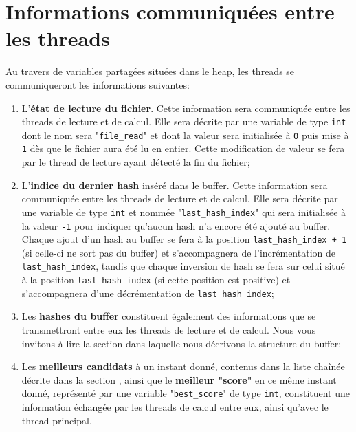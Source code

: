 \documentclass{article}
\begin{document}
\section{Informations communiquées entre les threads}
\noindent
	Au travers de variables partagées situées dans le heap, les threads se communiqueront les informations suivantes:
	
	\begin{enumerate}
		\item
		L'\textbf{état de lecture du fichier}.
		Cette information sera communiquée entre les threads de lecture et de calcul.
		Elle sera décrite par une variable de type \lstinline{int} dont le nom sera "\lstinline{file_read}" et dont la valeur sera initialisée à \lstinline{0} puis mise à \lstinline{1} dès que le fichier aura été lu en entier.
		Cette modification de valeur se fera par le thread de lecture ayant détecté la fin du fichier;
		
		\item
		L'\textbf{indice du dernier hash} inséré dans le buffer.
		Cette information sera communiquée entre les threads de lecture et de calcul.
		Elle sera décrite par une variable de type \lstinline{int} et nommée "\lstinline{last_hash_index}" qui sera initialisée à la valeur \lstinline{-1} pour indiquer qu'aucun hash n'a encore été ajouté au buffer.
		Chaque ajout d'un hash au buffer se fera à la position \lstinline{last_hash_index + 1} (si celle-ci ne sort pas du buffer) et s'accompagnera de l'incrémentation de \lstinline{last_hash_index}, tandis que chaque inversion de hash se fera sur celui situé à la position \lstinline{last_hash_index} (si cette position est positive) et s'accompagnera d'une décrémentation de \lstinline{last_hash_index};
		
		\item 
		Les \textbf{hashes du buffer} constituent également des informations que se transmettront entre eux les threads de lecture et de calcul. Nous vous invitons à lire la section \textit{} dans laquelle nous décrivons la structure du buffer;
		
		\item
		Les \textbf{meilleurs candidats} à un instant donné, contenus dans la liste chaînée décrite dans la section \textit{}, ainsi que le \textbf{meilleur "score"} en ce même instant donné, représenté par une variable "\lstinline{best_score}" de type \lstinline{int}, constituent une information échangée par les threads de calcul entre eux, ainsi qu'avec le thread principal.
		
	\end{enumerate}
\end{document}
